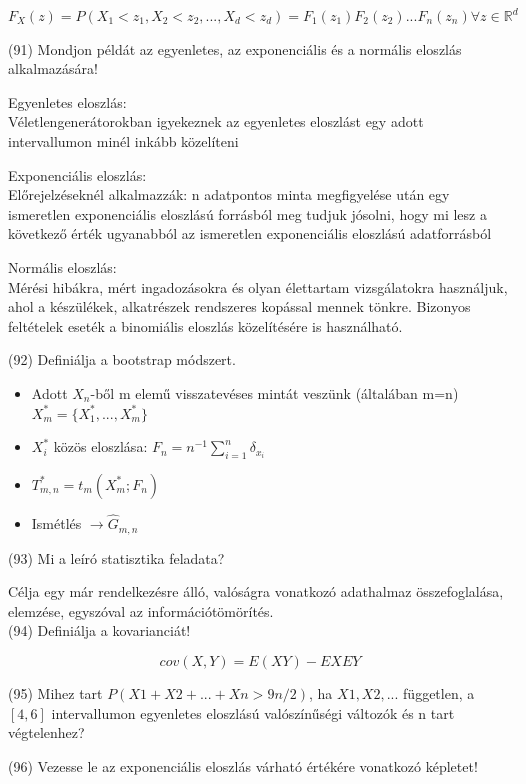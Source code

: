 \documentclass[12p]{article}
\begin{document}
$F_X(z) = P(X_1<z_1, X_2<z_2, ..., X_d<z_d) = F_1(z_1)F_2(z_2)...F_n(z_n) \forall z \in \mathbb{R}^d$

(91) Mondjon példát az egyenletes, az exponenciális és a normális eloszlás alkalmazására!

Egyenletes eloszlás:\\
Véletlengenerátorokban igyekeznek az egyenletes eloszlást egy adott intervallumon minél inkább közelíteni

Exponenciális eloszlás:\\
Előrejelzéseknél alkalmazzák: n adatpontos minta megfigyelése után egy ismeretlen exponenciális eloszlású forrásból meg tudjuk jósolni, hogy mi lesz a következő érték ugyanabból az ismeretlen exponenciális eloszlású adatforrásból

Normális eloszlás:\\
Mérési hibákra, mért ingadozásokra és olyan élettartam vizsgálatokra használjuk, ahol a készülékek, alkatrészek rendszeres kopással mennek tönkre. Bizonyos feltételek eseték a binomiális eloszlás közelítésére is használható.

(92) Definiálja a bootstrap módszert.

\begin{itemize}
	\item Adott $X_n$-ből m elemű visszatevéses mintát veszünk (általában m=n) \quad $X^{*}_m = \{X^{*}_1,...,X^{*}_m\}$
	\item $X_i^{*}$ közös eloszlása: $F_n = n^{-1} \sum^n_{i=1} \delta_{x_i}$
	\item $T^{*}_{m,n} = t_m (X^{*}_m;F_n)$
	\item Ismétlés $\rightarrow \hat{G}_{m,n}$
	
\end{itemize}


(93) Mi a leíró statisztika feladata?

Célja egy már rendelkezésre álló, valóságra vonatkozó adathalmaz összefoglalása, elemzése, egyszóval az információtömörítés.\\

(94) Definiálja a kovarianciát!

$$cov(X, Y) = E(XY) - EXEY$$

(95) Mihez tart $P(X1+X2+ ... +Xn > 9n/2)$, ha $X1, X2, . . .$ független, a $[4,6]$ intervallumon
egyenletes eloszlású valószínűségi változók és n tart végtelenhez?

(96) Vezesse le az exponenciális eloszlás várható értékére vonatkozó képletet!
\end{document}

